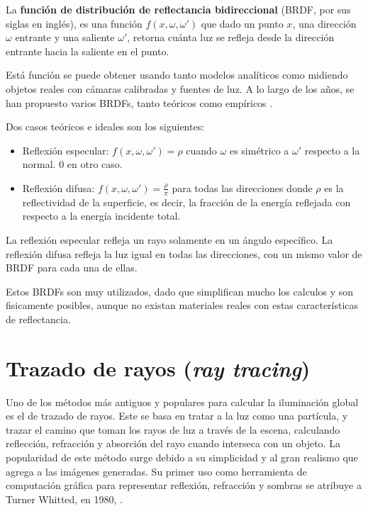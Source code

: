La \textbf{función de distribución de reflectancia bidireccional} (BRDF, por sus siglas en inglés), es una función $f(x, \omega, \omega')$ que dado un punto $x$, una dirección $\omega$ entrante y una saliente $\omega'$, retorna cuánta luz se refleja desde la dirección entrante hacia la saliente en el punto.

Está función se puede obtener usando tanto modelos analíticos como midiendo objetos reales con cámaras calibradas y fuentes de luz.
A lo largo de los años, se han propuesto varios BRDFs, tanto teóricos como empíricos \cite{review-of-brdf-models}.


Dos casos teóricos e ideales son los siguientes:

\begin{itemize}
    \item Reflexión especular: $f(x, \omega, \omega') = \rho$ cuando $\omega$ es simétrico a $\omega'$ respecto a la normal. $0$ en otro caso.
    \item Reflexión difusa: $f(x, \omega, \omega') = \frac{\rho}{\pi}$ para todas las direcciones donde $\rho$ es la reflectividad de la superficie, es decir, la fracción de la energía reflejada con respecto a la energía incidente total.
\end{itemize}

La reflexión especular refleja un rayo solamente en un ángulo específico.
La reflexión difusa refleja la luz igual en todas las direcciones, con un mismo valor de BRDF para cada una de ellas.

Estos BRDFs son muy utilizados, dado que simplifican mucho los calculos y son fisicamente posibles, aunque no existan materiales reales con estas características de reflectancia.

\section{Trazado de rayos (\textit{ray tracing})}\label{sec:ray-tracing}

Uno de los métodos más antiguos y populares para calcular la iluminación global es el de trazado de rayos.
Este se basa en tratar a la luz como una partícula, y trazar el camino que toman los rayos de luz a través de la escena, calculando reflección, refracción y absorción del rayo cuando interseca con un objeto.
La popularidad de este método surge debido a su simplicidad y al gran realismo que agrega a las imágenes generadas.
Su primer uso como herramienta de computación gráfica para representar reflexión, refracción y sombras se atribuye a Turner Whitted, en 1980, \cite{whitted-1980}.

